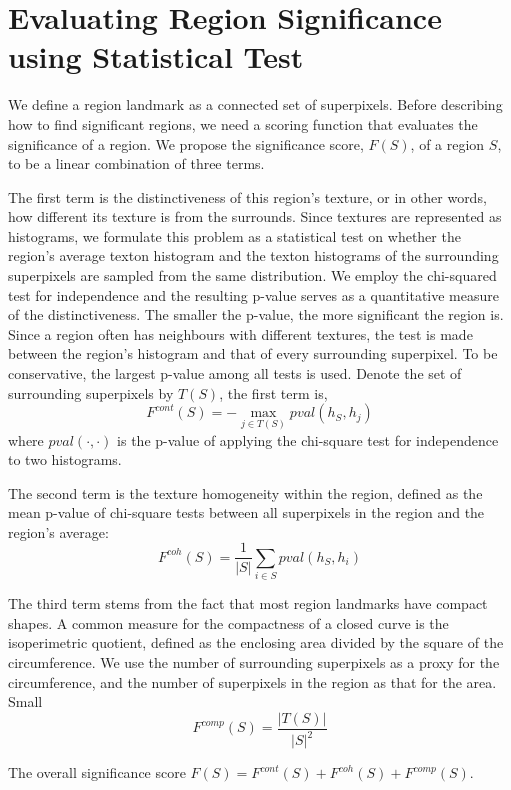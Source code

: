 \documentclass{llncs}
\begin{document}

\section{Evaluating Region Significance using Statistical Test}

We define a region landmark as a connected set of superpixels. Before describing how to find significant regions, we need a scoring function that evaluates the significance of a region. We propose the significance score, $F(S)$, of a region $S$, to be a linear combination of three terms. 

The first term is the distinctiveness of this region's texture, or in other words, how different its texture is from the surrounds. Since textures are represented as histograms, we formulate this problem as a statistical test on whether the region's average texton histogram and the texton histograms of the surrounding superpixels are sampled from the same distribution. We employ the chi-squared test for independence and the resulting p-value serves as a quantitative measure of the distinctiveness. The smaller the p-value, the more significant the region is. Since a region often has neighbours with different textures, the test is made between the region's histogram and that of every surrounding superpixel. To be conservative, the largest p-value among all tests is used. Denote the set of surrounding superpixels by $T(S)$, the first term is,
$$F^{cont}(S) = - \max_{j\in T(S)} pval(h_S, h_j)$$
where $pval(\cdot,\cdot)$ is the p-value of applying the chi-square test for independence to two histograms.

The second term is the texture homogeneity within the region, defined as the mean p-value of chi-square tests between all superpixels in the region and the region's average:
$$F^{coh}(S) = \frac{1}{|S|} \sum_{i\in S} pval(h_S, h_i)$$

The third term stems from the fact that most region landmarks have compact shapes. A common measure for the compactness of a closed curve is the isoperimetric quotient, defined as the enclosing area divided by the square of the circumference. We use the number of surrounding superpixels as a proxy for the circumference, and the number of superpixels in the region as that for the area. Small 
$$F^{comp}(S) = \frac{|T(S)|}{|S|^2}$$

The overall significance score $F(S) = F^{cont}(S) + F^{coh}(S) + F^{comp}(S)$.
\end{document}
